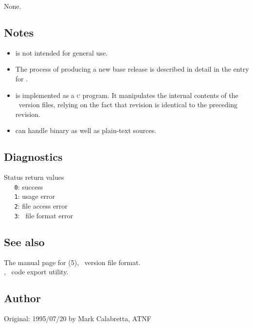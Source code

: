None.

\subsection*{Notes}
 
\begin{itemize}
\item
    is not intended for general use.

\item
   The process of producing a new base release is described in detail in the
   entry for .

\item
    is implemented as a \textsc{c} program.  It manipulates the
   internal contents of the \rcs\ version files, relying on the fact that
   revision  is identical to the preceding revision.

\item
    can handle binary as well as plain-text sources.
\end{itemize}

\subsection*{Diagnostics}
 
Status return values
\\ \verb+   0+: success
\\ \verb+   1+: usage error
\\ \verb+   2+: file access error
\\ \verb+   3+: \rcs\ file format error
 
\subsection*{See also}
 
The manual page for (5), \rcs\ version file format.\\
, \aipspp\ code export utility.

 
\subsection*{Author}
 
Original: 1995/07/20 by Mark Calabretta, ATNF


